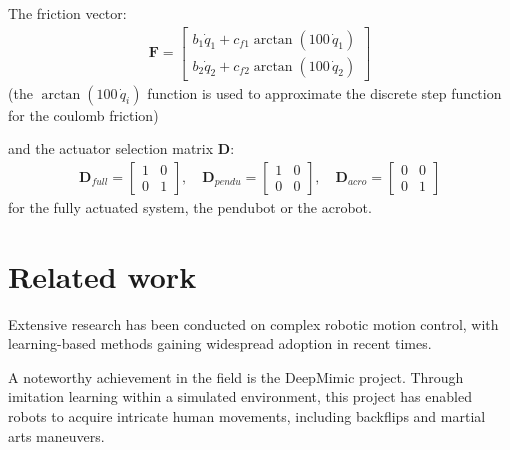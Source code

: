     The friction vector:
    \begin{equation}
        \begin{split}
            \mathbf{F} =
            \left[
                \begin{matrix}
                    b_1 \dot{q}_1 + c_{f1} \arctan(100\,\dot{q}_1) \\
                    b_2 \dot{q}_2 + c_{f2} \arctan(100\,\dot{q}_2)
                \end{matrix}
            \right]
        \end{split}
    \end{equation}
    (the \(\arctan(100\,\dot{q}_i)\) function is used to approximate the discrete step function for the coulomb friction)

    and the actuator selection matrix \(\mathbf{D}\):
    \begin{equation}
        \begin{split}
            \mathbf{D}_{full} =
            \left[
                \begin{matrix}
                    1 & 0 \\
                    0 & 1
                \end{matrix}
            \right],
            \quad
            \mathbf{D}_{pendu} =
            \left[
                \begin{matrix}
                    1 & 0 \\
                    0 & 0
                \end{matrix}
            \right],
            \quad
            \mathbf{D}_{acro} =
            \left[
                \begin{matrix}
                    0 & 0 \\
                    0 & 1
                \end{matrix}
            \right]
        \end{split}
    \end{equation}
    for the fully actuated system, the pendubot or the acrobot.

\section{Related work}
Extensive research has been conducted on complex robotic motion control, with learning-based methods gaining widespread adoption in recent times. 

A noteworthy achievement in the field is the DeepMimic project\cite{peng2018deepmimic}. Through imitation learning within a simulated environment, this project has enabled robots to acquire intricate human movements, including backflips and martial arts maneuvers. 

